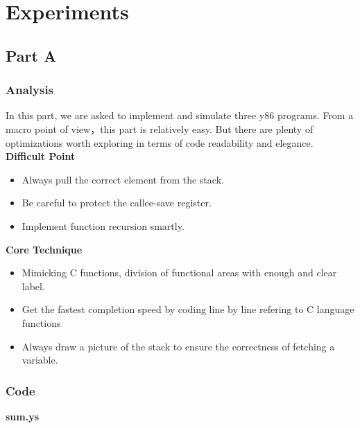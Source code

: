 \documentclass{article}
\begin{document}
\section{Experiments}
\subsection{Part A}
\subsubsection{Analysis}
In this part, we are asked to implement and simulate three y86 programs. 
From a macro point of view，this part is relatively easy. 
But there are plenty of optimizations worth exploring in terms of code readability and elegance.\\
\textbf{Difficult Point} 
\begin{itemize}
        \item Always pull the correct element from the stack.
        \item Be careful to protect the callee-save register.
        \item Implement function recursion smartly.
\end{itemize}
\textbf{Core Technique}
\begin{itemize}
        \item Mimicking C functions, division of functional areas with enough and clear label.
        \item Get the fastest completion speed by coding line by line refering to C language functions
        \item Always draw a picture of the stack to ensure the correctness of fetching a variable.
\end{itemize}

\subsubsection{Code}
\begin{center}
        \textbf{sum.ys}
\end{center}
\end{document}
